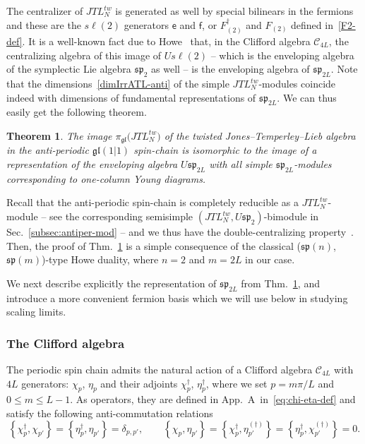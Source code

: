 \documentclass[11pt]{article}
\newcommand{\JTL}[1]{JTL_{#1}}
\newcommand{\f}{\mathsf{f}}
\newcommand{\e}{\mathsf{e}}
\newcommand{\Clif}[1]{\mathscr{C}_{#1}}
\newcommand{\gl}{\mathfrak{gl}}
\newcommand{\ssp}{\mathfrak{sp}}
\newcommand{\repgl}{\pi_{\gl}}
\newcommand{\Appfourier}{A~}
\newtheorem{thm}[subsubsection]{Theorem}
\theoremstyle{definition}
\begin{document}
The centralizer of  $\JTL{N}^{tw}$  is generated as well by special bilinears in the fermions and these are
 the $s\ell(2)$ generators $\e$ and $\f$, or $F_{(2)}^\dagger$ and
 $F_{(2)}$ defined in~\eqref{F2-def}.  It is a well-known fact due to Howe~\cite{H3} that,  in the Clifford algebra $\Clif{4L}$, the centralizing algebra of this image of $U s\ell(2)$ -- which is the enveloping algebra of the symplectic Lie algebra $\ssp_2$ as well -- is the enveloping algebra of $\ssp_{2L}$. Note that the dimensions~\eqref{dimIrrATL-anti} of the simple $\JTL{N}^{tw}$-modules coincide indeed  with dimensions of fundamental representations of $\ssp_{2L}$. We can thus easily get the following theorem.
  \begin{thm}\label{thm:Lie-JTLtw}
The image $\repgl\bigl(\JTL{N}^{tw}\bigr)$ of the twisted Jones--Temperley--Lieb algebra in the anti-periodic $\gl(1|1)$ spin-chain is isomorphic to the image of a representation of the enveloping algebra $U \ssp_{2L}$ with all simple $\ssp_{2L}$-modules corresponding to one-column
 Young diagrams.
\end{thm}
 Recall that the anti-periodic spin-chain is completely reducible as a $\JTL{N}^{tw}$-module -- see the corresponding semisimple $(\JTL{N}^{tw},U\ssp_{2})$-bimodule in Sec.~\ref{subsec:antiper-mod} -- and we thus have the double-centralizing property~\cite[Thm.~4.1.13]{goodwall}. Then, the proof of Thm.~\ref{thm:Lie-JTLtw} is a simple consequence of the classical ($\ssp(n)$,\,$\ssp(m)$)-type Howe duality, where $n=2$ and $m=2L$ in our case.

We next describe explicitly the representation of $\ssp_{2L}$ from Thm.~\ref{thm:Lie-JTLtw}, and introduce a  more convenient fermion basis which we will use below in studying scaling limits.

\subsubsection{The Clifford algebra}\label{sec:ham-spec}
The periodic spin chain admits the natural   action of  a Clifford algebra $\Clif{4L}$ with
$4L$ generators: $\chi_{p}$, $\eta_p$ and their
adjoints $\chi^{\dagger}_{p}$, $\eta^{\dagger}_p$, where we set
$p=m\pi/L$ and $0\leq m\leq L-1$. As operators, they are defined in
App.~\Appfourier in~\eqref{eq:chi-eta-def} and  satisfy the following anti-commutation relations
\begin{equation}\label{chi-eta-rels-0}
\left\{\chi^{\dagger}_p,\chi_{p'}\right\} = \left\{\eta^{\dagger}_p,\eta_{p'}\right\} =
\delta_{p,p'}, \qquad
\left\{\chi_p,\eta_{p'}\right\} =
\left\{\chi^{\dagger}_p,\eta^{(\dagger)}_{p'}\right\} =
\left\{\eta^{\dagger}_p,\chi^{(\dagger)}_{p'}\right\} = 0.
\end{equation}
\end{document}
